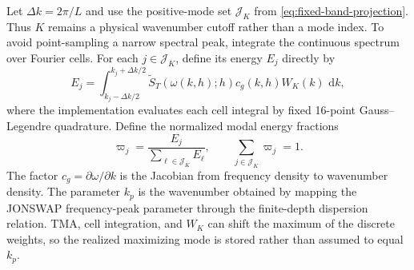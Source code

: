 \documentclass[11pt]{article}
\newcommand{\dd}{\,\mathrm d}
\begin{document}
Let $\Delta k=2\pi/L$ and use the positive-mode set $\mathcal J_K$ from
\eqref{eq:fixed-band-projection}.  Thus $K$ remains a physical wavenumber
cutoff rather than a mode index.  To
avoid point-sampling a narrow spectral peak, integrate the continuous
spectrum over Fourier cells.  For each $j\in\mathcal J_K$, define its energy
$E_j$ directly by
\begin{equation}
  E_j=\int_{k_j-\Delta k/2}^{k_j+\Delta k/2}
  \widetilde S_T(\omega(k,h);h)c_g(k,h)W_K(k)\,\dd k,
\end{equation}
where the implementation evaluates each cell integral by fixed 16-point
Gauss--Legendre quadrature.  Define the normalized modal energy fractions
\begin{equation}
  \varpi_j=\frac{E_j}{\sum_{\ell\in\mathcal J_K}E_\ell},
  \qquad
  \sum_{j\in\mathcal J_K}\varpi_j=1.
  \label{eq:jonswap-weights}
\end{equation}
The factor $c_g=\partial\omega/\partial k$ is the Jacobian from frequency
density to wavenumber density.  The parameter $k_p$ is the wavenumber obtained
by mapping the JONSWAP frequency-peak parameter through the finite-depth
dispersion relation.  TMA, cell integration, and $W_K$ can shift the maximum
of the discrete weights, so the realized maximizing mode is stored rather
than assumed to equal $k_p$.
\end{document}
